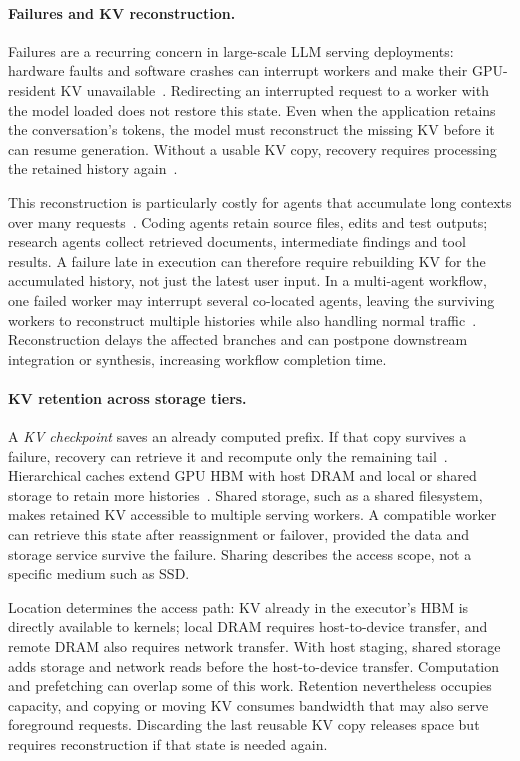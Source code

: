 \paragraph{Failures and KV reconstruction.}
Failures are a recurring concern in large-scale LLM serving deployments:
hardware faults and software crashes can interrupt workers and make
their GPU-resident KV unavailable~\cite{cao2026lumen,jayakody2026ghostserve}.
Redirecting an interrupted request to a worker with the model loaded
does not restore this state. Even when the application retains the
conversation's tokens, the model must reconstruct the missing KV before
it can resume generation. Without a usable KV copy, recovery requires
processing the retained history again~\cite{strati2024dejavu}.

This reconstruction is particularly costly for agents that accumulate
long contexts over many requests~\cite{jayakody2026ghostserve}.
Coding agents retain source files, edits and test outputs; research
agents collect retrieved documents, intermediate findings and tool
results. A failure late in execution can therefore require rebuilding
KV for the accumulated history, not just the latest user input.
In a multi-agent workflow, one failed worker may interrupt several
co-located agents, leaving the surviving workers to reconstruct multiple
histories while also handling normal traffic~\cite{cao2026lumen}.
Reconstruction delays the affected branches and can postpone downstream
integration or synthesis, increasing workflow completion time.

\paragraph{KV retention across storage tiers.}
A \emph{KV checkpoint} saves an already computed prefix. If that copy
survives a failure, recovery can retrieve it and recompute only the
remaining tail~\cite{strati2024dejavu,jayakody2026ghostserve}.
Hierarchical caches extend GPU HBM with host DRAM and local or shared
storage to retain more histories~\cite{gao2024cachedattention,qin2025mooncake}.
Shared storage, such as a shared filesystem, makes retained KV accessible
to multiple serving workers. A compatible worker can retrieve this state
after reassignment or failover, provided the data and storage service
survive the failure. Sharing describes the access scope, not a specific
medium such as SSD.

Location determines the access path: KV already in the executor's HBM
is directly available to kernels; local DRAM requires host-to-device
transfer, and remote DRAM also requires network transfer. With host
staging, shared storage adds storage and network reads before the
host-to-device transfer. Computation and prefetching can overlap some
of this work. Retention nevertheless occupies
capacity, and copying or moving KV consumes bandwidth that may also serve
foreground requests. Discarding the last reusable KV copy releases space
but requires reconstruction if that state is needed again.

